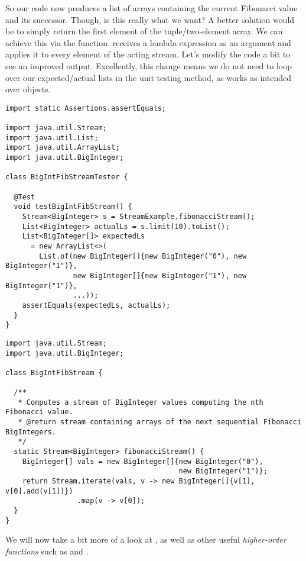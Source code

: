 So our code now produces a list of  arrays containing the current Fibonacci value and its successor. Though, is this really what we want? A better solution would be to simply return the first element of the tuple/two-element array. We can achieve this via the  function.  receives a lambda expression as an argument and applies it to every element of the acting stream. Let's modify the code a bit to see an improved output. Excellently, this change means we do not need to loop over our expected/actual lists in the unit testing method, as  works as intended over  objects.

\begin{cl}[]{}
\begin{lstlisting}[language=MyJava]
import static Assertions.assertEquals;

import java.util.Stream;
import java.util.List;
import java.util.ArrayList;
import java.util.BigInteger;

class BigIntFibStreamTester {

  @Test
  void testBigIntFibStream() {
    Stream<BigInteger> s = StreamExample.fibonacciStream();
    List<BigInteger> actualLs = s.limit(10).toList();
    List<BigInteger[]> expectedLs 
      = new ArrayList<>(
        List.of(new BigInteger[]{new BigInteger("0"), new BigInteger("1")},
                new BigInteger[]{new BigInteger("1"), new BigInteger("1")},
                ...));
    assertEquals(expectedLs, actualLs);
  }
}
\end{lstlisting}
\end{cl}

\begin{cl}[]{}
\begin{lstlisting}[language=MyJava]
import java.util.Stream;
import java.util.BigInteger;

class BigIntFibStream {

  /**
   * Computes a stream of BigInteger values computing the nth Fibonacci value.
   * @return stream containing arrays of the next sequential Fibonacci BigIntegers.
   */
  static Stream<BigInteger> fibonacciStream() {
    BigInteger[] vals = new BigInteger[]{new BigInteger("0"),
                                         new BigInteger("1")};
    return Stream.iterate(vals, v -> new BigInteger[]{v[1], v[0].add(v[1])})
                 .map(v -> v[0]);
  }
}
\end{lstlisting}
\end{cl}

We will now take a bit more of a look at , as well as other useful \textit{higher-order functions} such as  and .

